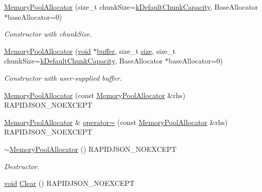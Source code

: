 \begin{DoxyCompactItemize}
\item 
\hyperlink{classMemoryPoolAllocator_aeec85ac657f242ac5620115141be5209}{Memory\+Pool\+Allocator} (size\+\_\+t chunk\+Size=\hyperlink{classMemoryPoolAllocator_a8d9337bc406a25dd06a24ee3fa5fb58c}{k\+Default\+Chunk\+Capacity}, Base\+Allocator $\ast$base\+Allocator=0)
\begin{DoxyCompactList}\small\item\em Constructor with chunk\+Size. \end{DoxyCompactList}\item 
\hyperlink{classMemoryPoolAllocator_a1f0d865093fdb955d956b7a445a8ddbf}{Memory\+Pool\+Allocator} (\hyperlink{imgui__impl__opengl3__loader_8h_ac668e7cffd9e2e9cfee428b9b2f34fa7}{void} $\ast$\hyperlink{imgui__impl__opengl3__loader_8h_a3667f558219c90437106b544a3ca00b8}{buffer}, size\+\_\+t \hyperlink{imgui__impl__opengl3__loader_8h_a3d1e3edfcf61ca2d831883e1afbad89e}{size}, size\+\_\+t chunk\+Size=\hyperlink{classMemoryPoolAllocator_a8d9337bc406a25dd06a24ee3fa5fb58c}{k\+Default\+Chunk\+Capacity}, Base\+Allocator $\ast$base\+Allocator=0)
\begin{DoxyCompactList}\small\item\em Constructor with user-\/supplied buffer. \end{DoxyCompactList}\item 
\hyperlink{classMemoryPoolAllocator_afa7a6555d8a6e151148c8876c60a36c5}{Memory\+Pool\+Allocator} (const \hyperlink{classMemoryPoolAllocator}{Memory\+Pool\+Allocator} \&rhs) R\+A\+P\+I\+D\+J\+S\+O\+N\+\_\+\+N\+O\+E\+X\+C\+E\+PT
\item 
\hyperlink{classMemoryPoolAllocator}{Memory\+Pool\+Allocator} \& \hyperlink{classMemoryPoolAllocator_a37de236cab0a94c6836b1d02475d4683}{operator=} (const \hyperlink{classMemoryPoolAllocator}{Memory\+Pool\+Allocator} \&rhs) R\+A\+P\+I\+D\+J\+S\+O\+N\+\_\+\+N\+O\+E\+X\+C\+E\+PT
\item 
\hyperlink{classMemoryPoolAllocator_aff48c4c1fa43bdd3a2b406231f0eb00e}{$\sim$\+Memory\+Pool\+Allocator} () R\+A\+P\+I\+D\+J\+S\+O\+N\+\_\+\+N\+O\+E\+X\+C\+E\+PT
\begin{DoxyCompactList}\small\item\em Destructor. \end{DoxyCompactList}\item 
\hyperlink{imgui__impl__opengl3__loader_8h_ac668e7cffd9e2e9cfee428b9b2f34fa7}{void} \hyperlink{classMemoryPoolAllocator_a6f6dce308aa10a28c898348db3bc75c1}{Clear} () R\+A\+P\+I\+D\+J\+S\+O\+N\+\_\+\+N\+O\+E\+X\+C\+E\+PT

\end{DoxyCompactItemize}
